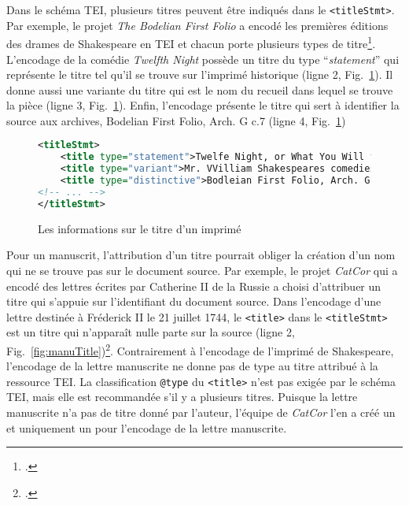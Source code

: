 \documentclass[class=article, crop=false]{standalone}
\begin{document}
Dans le schéma \acrshort{TEI}, plusieurs titres peuvent être indiqués dans le \texttt{<titleStmt>}. Par exemple, le projet \textit{The Bodelian First Folio} a encodé les premières éditions des drames de Shakespeare en \acrshort{TEI} et chacun porte plusieurs types de titre\footcite{BodelianFirstFolio}. L'encodage de la comédie \textit{Twelfth Night} possède un titre du type ``\textit{statement}'' qui représente le titre tel qu'il se trouve sur l'imprimé historique (ligne 2, Fig.~\ref{fig:printTitle}). Il donne aussi une variante du titre qui est le nom du recueil dans lequel se trouve la pièce (ligne 3, Fig.~\ref{fig:printTitle}). 
Enfin, l'encodage présente le titre qui sert à identifier la source aux archives, \og{}Bodelian First Folio, Arch. G c.7\fg{} (ligne 4, Fig.~\ref{fig:printTitle})

\begin{figure}[ht]
\centering
\begin{lstlisting}[language=XML]
<titleStmt>
	<title type="statement">Twelfe Night, or What You Will from Mr. William Shakespeares comedies, histories, &amp; tragedies. Published according to the true originall copies.</title>
	<title type="variant">Mr. VVilliam Shakespeares comedies, histories, &amp; tragedies</title>
	<title type="distinctive">Bodleian First Folio, Arch. G c.7</title>
<!-- ... -->
</titleStmt>
\end{lstlisting}
\caption{Les informations sur le titre d'un imprimé \protect\footnotemark}
\label{fig:printTitle}
\end{figure}

Pour un manuscrit, l'attribution d'un titre pourrait obliger la création d'un nom qui ne se trouve pas sur le document source. Par exemple, le projet \textit{CatCor} qui a encodé des lettres écrites par Catherine II de la Russie a choisi d'attribuer un titre qui s'appuie sur l'identifiant du document source. Dans l'encodage d'une lettre destinée à Fréderick II le 21 juillet 1744, le \texttt{<title>} dans le \texttt{<titleStmt>} est un titre qui n'apparaît nulle parte sur la source (ligne 2, Fig.~\ref{fig:manuTitle})\footcite{catcorprojectLetter02633Frederick2021}. Contrairement à l'encodage de l'imprimé de Shakespeare, l'encodage de la lettre manuscrite ne donne pas de type au titre attribué à la ressource \acrshort{TEI}. La classification \texttt{@type} du \texttt{<title>} n'est pas exigée par le schéma \acrshort{TEI}, mais elle est recommandée s'il y a plusieurs titres. Puisque la lettre manuscrite n'a pas de titre donné par l'auteur, l'équipe de \textit{CatCor} l'en a créé un et uniquement un pour l'encodage de la lettre manuscrite.
\end{document}
